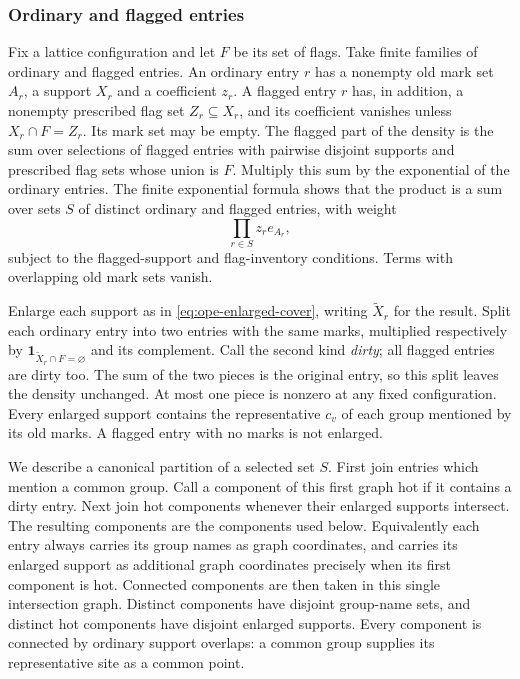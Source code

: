 \subsubsection{Ordinary and flagged entries}
Fix a lattice configuration and let $F$ be its set of flags. Take
finite families of ordinary and flagged entries. An
ordinary entry $r$ has a nonempty old mark set $A_r$, a support
$X_r$ and a coefficient $z_r$. A flagged entry $r$ has, in addition,
a nonempty prescribed flag set $Z_r\subseteq X_r$, and its coefficient
vanishes unless $X_r\cap F=Z_r$. Its mark set may be empty.
The flagged part of the density is the sum over selections of flagged
entries with pairwise disjoint supports and prescribed flag sets whose
union is $F$. Multiply this sum by the exponential of the ordinary
entries. The finite exponential formula shows that the product is a
sum over sets $S$ of distinct ordinary and flagged entries, with weight
\[
 \prod_{r\in S}z_r e_{A_r},
\]
subject to the flagged-support and flag-inventory conditions. Terms
with overlapping old mark sets vanish.

Enlarge each support as in \eqref{eq:ope-enlarged-cover}, writing
$\widetilde X_r$ for the result. Split each ordinary entry into two
entries with the same marks, multiplied respectively by
$\boldsymbol1_{\widetilde X_r\cap F=\varnothing}$ and its complement.
Call the second kind \emph{dirty}; all flagged entries are dirty too.
The sum of the two pieces is the original entry, so this split leaves
the density unchanged. At most one piece is nonzero at any fixed
configuration. Every enlarged support contains the representative
$c_v$ of each group mentioned by its old marks. A flagged entry with
no marks is not enlarged.

We describe a canonical partition of a selected set $S$. First join
entries which mention a common group. Call a component of this first
graph hot if it contains a dirty entry. Next join hot components
whenever their enlarged supports intersect. The resulting components
are the components used below. Equivalently each entry always carries
its group names as graph coordinates, and carries its enlarged support
as additional graph coordinates precisely when its first component
is hot. Connected components are then taken in this single intersection
graph. Distinct components have disjoint group-name sets, and distinct
hot components have disjoint enlarged supports. Every component is
connected by ordinary support overlaps: a common group supplies its
representative site as a common point.

